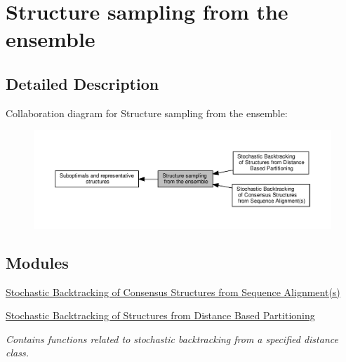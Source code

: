 \hypertarget{group__subopt__stochbt}{}\section{Structure sampling from the ensemble}
\label{group__subopt__stochbt}


\subsection{Detailed Description}
Collaboration diagram for Structure sampling from the ensemble\+:
\nopagebreak
\begin{figure}[H]
\begin{center}
\leavevmode
\includegraphics[width=350pt]{group__subopt__stochbt}
\end{center}
\end{figure}
\subsection*{Modules}
\begin{DoxyCompactItemize}
\item 
\hyperlink{group__consensus__stochbt}{Stochastic Backtracking of Consensus Structures from Sequence Alignment(s)}
\item 
\hyperlink{group__kl__neighborhood__stochbt}{Stochastic Backtracking of Structures from Distance Based Partitioning}
\begin{DoxyCompactList}\small\item\em Contains functions related to stochastic backtracking from a specified distance class. \end{DoxyCompactList}\end{DoxyCompactItemize}
